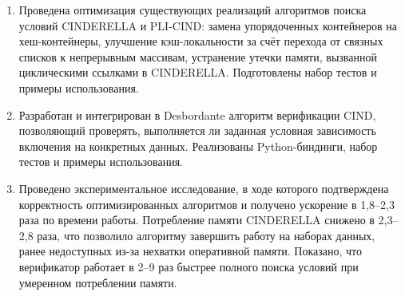 \begin{enumerate}
    \item Проведена оптимизация существующих реализаций алгоритмов поиска условий CINDERELLA и PLI-CIND: замена упорядоченных контейнеров на хеш-контейнеры, улучшение кэш-локальности за счёт перехода от связных списков к непрерывным массивам, устранение утечки памяти, вызванной циклическими ссылками в CINDERELLA. Подготовлены набор тестов и примеры использования.

    \item Разработан и интегрирован в Desbordante алгоритм верификации CIND, позволяющий проверять, выполняется ли заданная условная зависимость включения на конкретных данных. Реализованы Python-биндинги, набор тестов и примеры использования.

    \item Проведено экспериментальное исследование, в ходе которого подтверждена корректность оптимизированных алгоритмов и получено ускорение в 1{,}8--2{,}3 раза по времени работы. Потребление памяти CINDERELLA снижено в 2{,}3--2{,}8 раза, что позволило алгоритму завершить работу на наборах данных, ранее недоступных из-за нехватки оперативной памяти. Показано, что верификатор работает в 2--9 раз быстрее полного поиска условий при умеренном потреблении памяти.
\end{enumerate}
